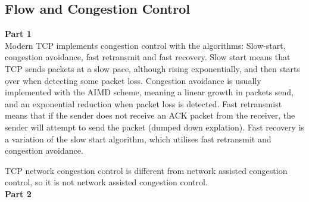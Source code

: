 \subsection{Flow and Congestion Control}
\textbf{Part 1}\\
Modern TCP implements congestion control with the algorithms:
Slow-start, congestion avoidance, fast retransmit and fast
recovery. Slow start means that TCP sends packets at a slow pace,
although rising exponentially, and then starts over when detecting
some packet loss. Congestion avoidance is usually implemented with the
AIMD scheme, meaning a linear growth in packets send, and an
exponential reduction when packet loss is detected. Fast retransmist
means that if the sender does not receive an ACK packet from the
receiver, the sender will attempt to send the packet (dumped down
explation). Fast recovery is a variation of the slow start algorithm,
which utilises fast retransmit and congestion avoidance.

TCP network congestion control is different from network assisted congestion
control, so it is not network assisted congestion control.\\

\noindent \textbf{Part 2}\\
